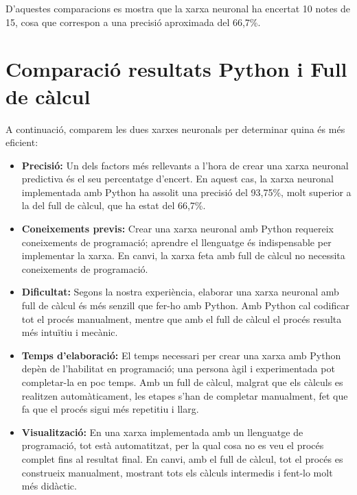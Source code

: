 D’aquestes comparacions es mostra que la xarxa neuronal ha encertat 10 notes de 15, cosa que correspon a una precisió aproximada del 66,7\%.

\section{Comparació resultats Python i Full de càlcul}

A continuació, comparem les dues xarxes neuronals per determinar quina és més eficient:

\begin{itemize}

\item \textbf{Precisió:} Un dels factors més rellevants a l’hora de crear una xarxa neuronal predictiva és el seu percentatge d’encert. En aquest cas, la xarxa neuronal implementada amb Python ha assolit una precisió del 93,75\%, molt superior a la del full de càlcul, que ha estat del 66,7\%.

\item \textbf{Coneixements previs:} Crear una xarxa neuronal amb Python requereix coneixements de programació; aprendre el llenguatge és indispensable per implementar la xarxa. En canvi, la xarxa feta amb full de càlcul no necessita coneixements de programació.

\item \textbf{Dificultat:} Segons la nostra experiència, elaborar una xarxa neuronal amb full de càlcul és més senzill que fer-ho amb Python. Amb Python cal codificar tot el procés manualment, mentre que amb el full de càlcul el procés resulta més intuïtiu i mecànic.

\item \textbf{Temps d’elaboració:} El temps necessari per crear una xarxa amb Python depèn de l’habilitat en programació; una persona àgil i experimentada pot completar-la en poc temps. Amb un full de càlcul, malgrat que els càlculs es realitzen automàticament, les etapes s’han de completar manualment, fet que fa que el procés sigui més repetitiu i llarg.

\item \textbf{Visualització:} En una xarxa implementada amb un llenguatge de programació, tot està automatitzat, per la qual cosa no es veu el procés complet fins al resultat final. En canvi, amb el full de càlcul, tot el procés es construeix manualment, mostrant tots els càlculs intermedis i fent-lo molt més didàctic.

\end{itemize}


